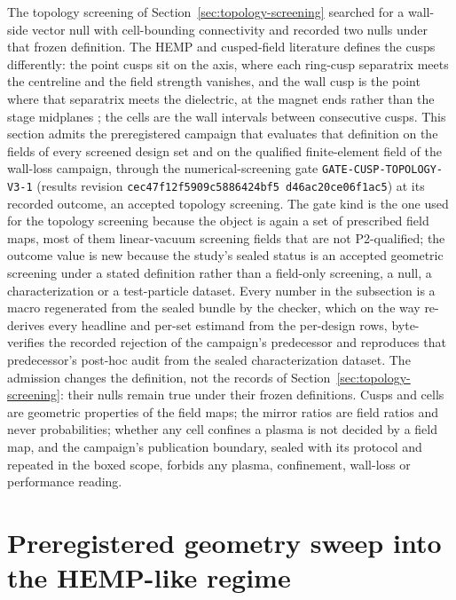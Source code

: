 \documentclass[11pt]{article}
\newcommand{\CuspTopologyEvidenceRevision}{\texttt{cec47f12\allowbreak{}f5909c58\allowbreak{}86424bf5\allowbreak{}%
d46ac20c\allowbreak{}e06f1ac5}}
\begin{document}
The topology screening of Section~\ref{sec:topology-screening} searched for a
wall-side vector null with cell-bounding connectivity and recorded two nulls
under that frozen definition. The HEMP and cusped-field literature defines the
cusps differently: the point cusps sit on the axis, where each ring-cusp
separatrix meets the centreline and the field strength vanishes, and the wall
cusp is the point where that separatrix meets the dielectric, at the magnet ends
rather than the stage midplanes
\cite{Gildea2012,Kornfeld2007,Koch2011,Lewerentz2023}; the cells are the wall
intervals between consecutive cusps. This section admits the preregistered
campaign that evaluates that definition on the fields of every screened design
set and on the qualified finite-element field of the wall-loss campaign, through
the numerical-screening gate \texttt{GATE-CUSP-TOPOLOGY-V3-1} (results revision
\CuspTopologyEvidenceRevision) at its recorded outcome, an accepted topology
screening. The gate kind is the one used for the topology screening because the
object is again a set of prescribed field maps, most of them linear-vacuum
screening fields that are not P2-qualified; the outcome value is new because the
study's sealed status is an accepted geometric screening under a stated
definition rather than a field-only screening, a null, a characterization or a
test-particle dataset. Every number in the subsection is a macro regenerated
from the sealed bundle by the checker, which on the way re-derives every
headline and per-set estimand from the per-design rows, byte-verifies the
recorded rejection of the campaign's predecessor and reproduces that
predecessor's post-hoc audit from the sealed characterization dataset. The
admission changes the definition, not the records of
Section~\ref{sec:topology-screening}: their nulls remain true under their frozen
definitions. Cusps and cells are geometric properties of the field maps; the
mirror ratios are field ratios and never probabilities; whether any cell
confines a plasma is not decided by a field map, and the campaign's publication
boundary, sealed with its protocol and repeated in the boxed scope, forbids any
plasma, confinement, wall-loss or performance reading.



\section{Preregistered geometry sweep into the HEMP-like regime}
\label{sec:l1a-sweep-v3}
\end{document}
